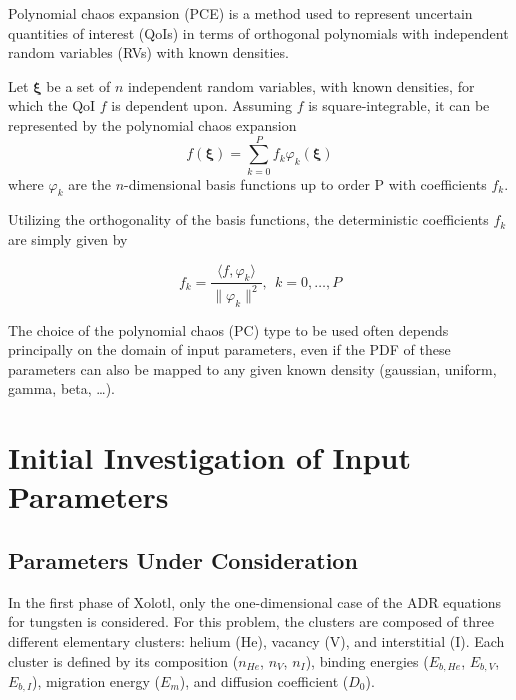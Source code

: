 \documentclass{article}
\begin{document}
Polynomial chaos expansion (PCE) is a method used to represent uncertain
quantities of interest (QoIs) in terms of orthogonal polynomials with
independent random variables (RVs) with known densities. \newline


Let $\boldsymbol \xi$ be a set of $n$ independent random variables, with known
densities, for which the QoI $f$ is dependent upon.  Assuming $f$ is
square-integrable, it can be represented by the polynomial chaos expansion
\begin{equation}
    f(\boldsymbol{\xi}) = \sum_{k=0}^P f_k\varphi_k(\boldsymbol \xi)
    \label{eq:pce}
\end{equation}
where $\varphi_k$ are the $n$-dimensional basis functions up to order P with
coefficients $f_k$.

Utilizing the orthogonality of the basis functions, the deterministic
coefficients $f_k$ are simply given by

\begin{equation}
    f_k = \frac{\langle
    f,\varphi_k \rangle}{\| \varphi_k \|^2} \text{,  } \; k=0,\ldots,P
\end{equation}

The choice of the polynomial chaos (PC) type to be used often depends
principally on the domain of input parameters, even if the PDF of these
parameters can also be mapped to any given known density (gaussian, uniform,
gamma, beta, \dots).

\section{Initial Investigation of Input Parameters}
\subsection{Parameters Under Consideration}

In the first phase of Xolotl, only the one-dimensional case of the ADR equations
for tungsten is considered. For this problem, the clusters are composed of
three different elementary clusters: helium (He), vacancy (V), and interstitial
(I). Each cluster is defined by its composition ($n_{He}$, $n_V$, $n_I$),
binding energies ($E_{b, He}$, $E_{b, V}$, $E_{b, I}$), migration energy
($E_m$), and diffusion coefficient ($D_0$). \newline
\end{document}
